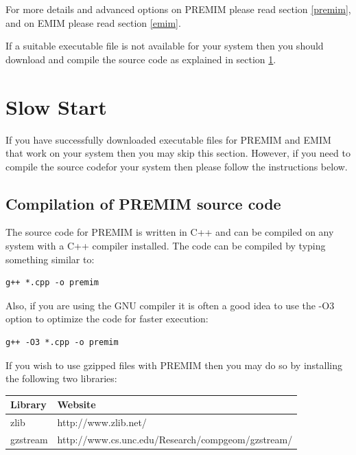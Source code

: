 \documentclass[a4paper,12pt]{article}
\begin{document}
For more details and advanced options on PREMIM please read  section \ref{premim}, and on EMIM please read  section \ref{emim}. 

If a suitable executable file is not available for your system then you should download and compile the source code as explained in  section \ref{comp}. 


\section{Slow Start}
\label{comp}

If you have successfully downloaded executable files for PREMIM and EMIM that work on your system then you may skip this section. However, if you need to compile the source codefor your system then please follow the instructions below. 
\subsection{Compilation of PREMIM source code}
\label{comp-premim}

The source code for PREMIM is written in C++ and can be compiled on any system with a C++ compiler installed. The code can be compiled by typing something similar to: 
\vspace{0.35cm} \begin{lstlisting}
g++ *.cpp -o premim 
\end{lstlisting} \vspace{0.35cm}
Also, if you are using the GNU compiler it is often a good idea to use the -O3 option to optimize the code for faster execution: 
\vspace{0.35cm} \begin{lstlisting}
g++ -O3 *.cpp -o premim 
\end{lstlisting} \vspace{0.35cm}
If you wish to use gzipped files with PREMIM then you may do so by installing the following two libraries: 

{\begin{center}\begin{tabular}{ll}
Library  & Website\\
\hline
zlib  & http://www.zlib.net/\\
gzstream  & http://www.cs.unc.edu/Research/compgeom/gzstream/\\
\end{tabular}\end{center}}
\end{document}
